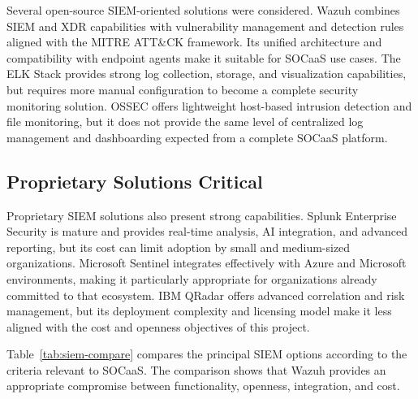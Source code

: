 Several open-source SIEM-oriented solutions were considered. Wazuh combines SIEM and XDR capabilities with vulnerability management and detection rules aligned with the MITRE ATT\&CK framework. Its unified architecture and compatibility with endpoint agents make it suitable for SOCaaS use cases. The ELK Stack provides strong log collection, storage, and visualization capabilities, but requires more manual configuration to become a complete security monitoring solution. OSSEC offers lightweight host-based intrusion detection and file monitoring, but it does not provide the same level of centralized log management and dashboarding expected from a complete SOCaaS platform.

\subsection{Proprietary Solutions Critical}
\label{subsec:siem-proprietary}

Proprietary SIEM solutions also present strong capabilities. Splunk Enterprise Security is mature and provides real-time analysis, AI integration, and advanced reporting, but its cost can limit adoption by small and medium-sized organizations. Microsoft Sentinel integrates effectively with Azure and Microsoft environments, making it particularly appropriate for organizations already committed to that ecosystem. IBM QRadar offers advanced correlation and risk management, but its deployment complexity and licensing model make it less aligned with the cost and openness objectives of this project.

Table~\ref{tab:siem-compare} compares the principal SIEM options according to the criteria relevant to SOCaaS. The comparison shows that Wazuh provides an appropriate compromise between functionality, openness, integration, and cost.

